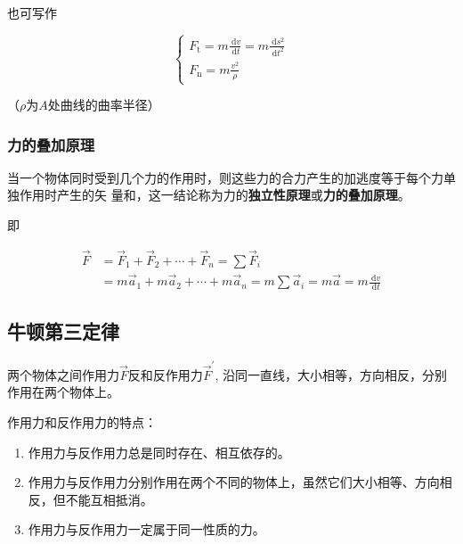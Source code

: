 \documentclass[
	12pt, %
	a4paper, %
]{myLegrandOrangeBook}
\begin{document}
    也可写作

    \begin{equation}
        \left\{\begin{array}{l}
        F_{\mathrm{t}}=m \frac{\mathrm{~d} v}{\mathrm{~d} t}=m \frac{\mathrm{~d} s^2}{\mathrm{~d} t^2} \\
        F_{\mathrm{n}}=m \frac{v^2}{\rho}
        \end{array}\right.
    \end{equation}

    （\(\rho\)为\(A\)处曲线的曲率半径）

\subsubsection{力的叠加原理}

    当一个物体同时受到几个力的作用时，则这些力的合力产生的加逃度等于每个力单独作用时产生的矢
    量和，这一结论称为力的\textbf{独立性原理}或\textbf{力的叠加原理}。

    即

    \begin{equation}
        \begin{aligned}
        \overrightarrow{F} & =\overrightarrow{F}_1+\overrightarrow{F}_2+\cdots+\overrightarrow{F}_n=\sum \overrightarrow{F}_i \\
        & =m \overrightarrow{a}_1+m \overrightarrow{a}_2+\cdots+m \overrightarrow{a}_n=m \sum \overrightarrow{a}_i=m \overrightarrow{a}=m \frac{\mathrm{~d} v}{\mathrm{~d} t}
        \end{aligned}
    \end{equation}

\subsection{牛顿第三定律}

    两个物体之间作用力\(\overrightarrow{F}\)反和反作用力\(\overrightarrow{F}^{'}\), 
    沿同一直线，大小相等，方向相反，分别作用在两个物体上。

    作用力和反作用力的特点：

    \begin{enumerate}
        \item 作用力与反作用力总是同时存在、相互依存的。
        \item 作用力与反作用力分别作用在两个不同的物体上，虽然它们大小相等、方向相反，但不能互相抵消。
        \item 作用力与反作用力一定属于同一性质的力。
    \end{enumerate}
\end{document}
